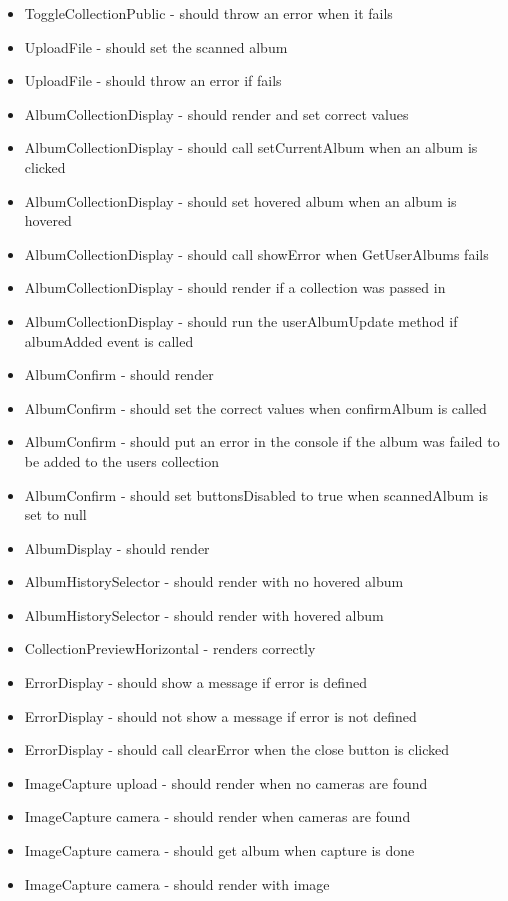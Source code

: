 \begin{multicols}{1}
\begin{itemize}
\item ToggleCollectionPublic - should throw an error when it fails
\item UploadFile - should set the scanned album
\item UploadFile - should throw an error if fails
\item AlbumCollectionDisplay - should render and set correct values
\item AlbumCollectionDisplay - should call setCurrentAlbum when an album is clicked
\item AlbumCollectionDisplay - should set hovered album when an album is hovered
\item AlbumCollectionDisplay - should call showError when GetUserAlbums fails
\item AlbumCollectionDisplay - should render if a collection was passed in
\item AlbumCollectionDisplay - should run the userAlbumUpdate method if albumAdded event is called
\item AlbumConfirm - should render
\item AlbumConfirm - should set the correct values when confirmAlbum is called
\item AlbumConfirm - should put an error in the console if the album was failed to be added to the users collection
\item AlbumConfirm - should set buttonsDisabled to true when scannedAlbum is set to null
\item AlbumDisplay - should render
\item AlbumHistorySelector - should render with no hovered album
\item AlbumHistorySelector - should render with hovered album
\item CollectionPreviewHorizontal - renders correctly
\item ErrorDisplay - should show a message if error is defined
\item ErrorDisplay - should not show a message if error is not defined
\item ErrorDisplay - should call clearError when the close button is clicked
\item ImageCapture upload - should render when no cameras are found
\item ImageCapture camera - should render when cameras are found
\item ImageCapture camera - should get album when capture is done
\item ImageCapture camera - should render with image

\end{itemize}
\end{multicols}
